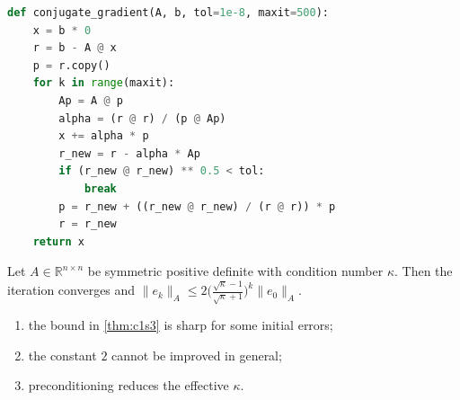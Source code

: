\begin{lstlisting}[language=python,caption={Reference implementation for c1s3.},label={lst:c1s3}]
def conjugate_gradient(A, b, tol=1e-8, maxit=500):
    x = b * 0
    r = b - A @ x
    p = r.copy()
    for k in range(maxit):
        Ap = A @ p
        alpha = (r @ r) / (p @ Ap)
        x += alpha * p
        r_new = r - alpha * Ap
        if (r_new @ r_new) ** 0.5 < tol:
            break
        p = r_new + ((r_new @ r_new) / (r @ r)) * p
        r = r_new
    return x
\end{lstlisting}

\lipsum[72-72]
\begin{theorem}\label{thm:c1s3}
Let $A\in\mathbb{R}^{n\times n}$ be symmetric positive definite with condition number $\kappa$. Then the iteration converges and
$\lVert e_k\rVert_A \le 2\bigl(\tfrac{\sqrt\kappa-1}{\sqrt\kappa+1}\bigr)^k\lVert e_0\rVert_A$.
\end{theorem}
\begin{enumerate}[label=(\roman*)]
\item the bound in \cref{thm:c1s3} is sharp for some initial errors;
\item the constant $2$ cannot be improved in general;
\item preconditioning reduces the effective $\kappa$.
\end{enumerate}

\kant[3-11]

